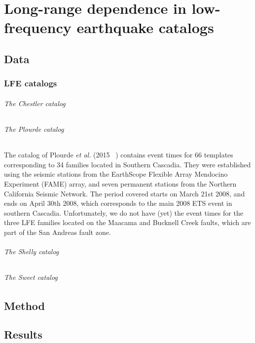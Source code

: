 \documentclass[main.tex]{subfiles}
\begin{document}
\part{Long-range dependence in low-frequency earthquake catalogs}

\chapter{Data}

\section{LFE catalogs}

\paragraph{The Chestler catalog}

\paragraph{The Plourde catalog} The catalog of Plourde \textit{et al.} (2015 ~\cite{PLO_2015}) contains event times for 66 templates corresponding to 34 families located in Southern Cascadia. They were established using the seismic stations from the EarthScope Flexible Array Mendocino Experiment (FAME) array, and seven permanent stations from the Northern California Seismic Network. The period covered starts on March 21st 2008, and ends on April 30th 2008, which corresponds to the main 2008 ETS event in southern Cascadia. Unfortunately, we do not have (yet) the event times for the three LFE families located on the Maacama and Bucknell Creek faults, which are part of the San Andreas fault zone.

\paragraph{The Shelly catalog}

\paragraph{The Sweet catalog}

\chapter{Method}

\chapter{Results}
\end{document}
